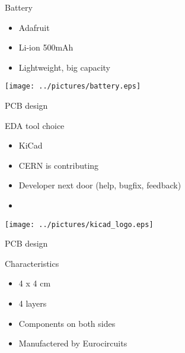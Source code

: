 \documentclass[compress,red]{beamer}
\begin{document}
\begin{frame}{Battery}

  \begin{block}{}
    \begin{itemize}
    \item Adafruit
    \item Li-ion 500mAh
    \item Lightweight, big capacity
    \end{itemize}
  \end{block}

  \begin{center}
    \texttt{[image: ../pictures/battery.eps]}
  \end{center}

  \note[item]{}

\end{frame}

\begin{frame}{PCB design}

  \begin{block}{EDA tool choice}
    \begin{itemize}
    \item KiCad
    \item CERN is contributing
    \item Developer next door (help, bugfix, feedback)
    \item 
    \end{itemize}
  \end{block}

  \begin{center}
    \texttt{[image: ../pictures/kicad\_logo.eps]}
  \end{center}

  \note[item]{}

\end{frame}

\begin{frame}{PCB design}

  \begin{block}{Characteristics}
    \begin{itemize}
    \item 4 x 4 cm
    \item 4 layers
    \item Components on both sides
    \item Manufactered by Eurocircuits
    \end{itemize}
  \end{block}

  \begin{center}
  \end{center}

  \note[item]{}

\end{frame}
\end{document}

